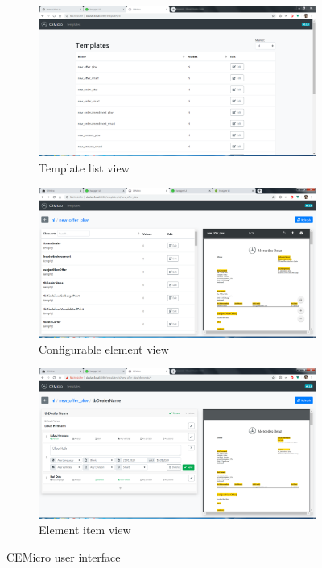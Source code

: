 \begin{figure}[ht]
  \begin{subfigure}[b]{0.5\linewidth}
    \includegraphics[width=\linewidth]{assets/cemicro-template-list.png}
    \caption{Template list view}
    \label{fig:cemicro-template-list}
  \end{subfigure}
  \begin{subfigure}[b]{0.5\linewidth}
    \includegraphics[width=\linewidth]{assets/cemicro-element-list.png}
    \caption{Configurable element view}
    \label{fig:cemicro-element-list}
  \end{subfigure}
  \begin{subfigure}[b]{0.5\linewidth}
    \includegraphics[width=\linewidth]{assets/cemicro-item-list.png}
    \caption{Element item view}
    \label{fig:cemicro-item-list}
  \end{subfigure}
  \caption{CEMicro user interface}
  \label{fig:cemicro-ui}
\end{figure}

